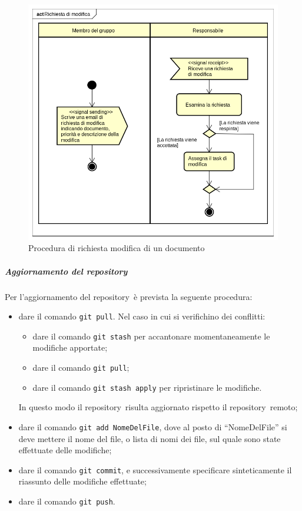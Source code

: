 \documentclass[../NormeProgetto.tex]{subfiles}
\begin{document}
				\newpage
				\begin{figure}[H]
					\centering
					\includegraphics[scale=0.5, width=\textwidth]{sections/img/proceduraRichiestaModifica.png}
					\caption{Procedura di richiesta modifica di un documento}\label{fig:Procedura di richiesta modifica di un documento} 
				\end{figure}
			\subparagraph{Aggiornamento del repository}
				Per l'aggiornamento del repository\g\ è prevista la seguente procedura:
				\begin{itemize}
					\item dare il comando \texttt{git pull}. Nel caso in cui si verifichino dei conflitti:
						\begin{itemize}
							\item dare il comando \texttt{git stash} per accantonare momentaneamente le modifiche apportate;
							\item dare il comando \texttt{git pull};
							\item dare il comando \texttt{git stash apply} per ripristinare le modifiche.
						\end{itemize}
					In questo modo il repository\g\ risulta aggiornato rispetto il repository\g\ remoto;
					\item dare il comando \texttt{git add NomeDelFile}, dove al posto di ``NomeDelFile'' si deve mettere il nome del file, o lista di nomi dei file, sul quale sono state effettuate delle modifiche;
					\item dare il comando \texttt{git commit}, e successivamente specificare sinteticamente il riassunto delle modifiche effettuate;
					\item dare il comando \texttt{git push}.
				\end{itemize}
\end{document}

